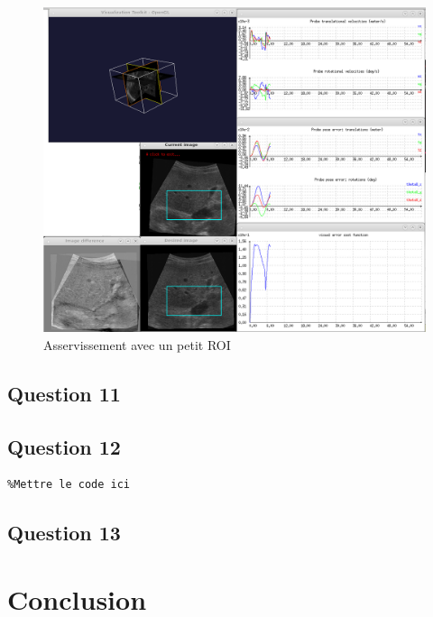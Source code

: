 \documentclass[a4paper,11pt]{article}
\begin{document}
\begin{figure}[!h]
    \centering
    \includegraphics[width=1.0\textwidth]{./images/q10_small.png}
    \caption{Asservissement avec un petit ROI}
    \label{smallRoi}
\end{figure}

\subsection{Question 11}

\subsection{Question 12}
\begin{verbatim}
%Mettre le code ici
\end{verbatim}

\subsection{Question 13}

\section{Conclusion}
\end{document}
